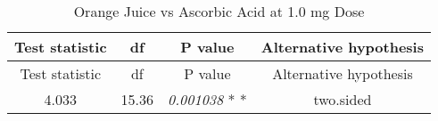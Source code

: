 \documentclass[]{article}
\begin{document}
\begin{longtable}[c]{@{}cccc@{}}
\caption{Orange Juice vs Ascorbic Acid at 1.0 mg Dose}\tabularnewline
\toprule
\begin{minipage}[b]{0.21\columnwidth}\centering\strut
Test statistic
\strut\end{minipage} &
\begin{minipage}[b]{0.07\columnwidth}\centering\strut
df
\strut\end{minipage} &
\begin{minipage}[b]{0.18\columnwidth}\centering\strut
P value
\strut\end{minipage} &
\begin{minipage}[b]{0.30\columnwidth}\centering\strut
Alternative hypothesis
\strut\end{minipage}\tabularnewline
\midrule
\endfirsthead
\toprule
\begin{minipage}[b]{0.21\columnwidth}\centering\strut
Test statistic
\strut\end{minipage} &
\begin{minipage}[b]{0.07\columnwidth}\centering\strut
df
\strut\end{minipage} &
\begin{minipage}[b]{0.18\columnwidth}\centering\strut
P value
\strut\end{minipage} &
\begin{minipage}[b]{0.30\columnwidth}\centering\strut
Alternative hypothesis
\strut\end{minipage}\tabularnewline
\midrule
\endhead
\begin{minipage}[t]{0.21\columnwidth}\centering\strut
4.033
\strut\end{minipage} &
\begin{minipage}[t]{0.07\columnwidth}\centering\strut
15.36
\strut\end{minipage} &
\begin{minipage}[t]{0.18\columnwidth}\centering\strut
\emph{0.001038} * *
\strut\end{minipage} &
\begin{minipage}[t]{0.30\columnwidth}\centering\strut
two.sided
\strut\end{minipage}\tabularnewline
\bottomrule
\end{longtable}
\end{document}
